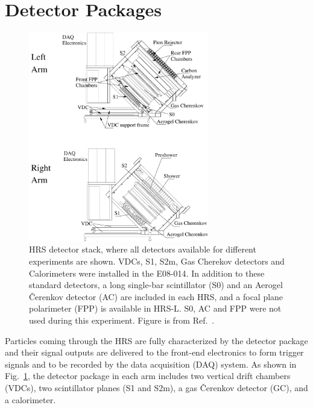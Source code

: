 \section{Detector Packages}
\begin{figure}[!ht]
 \begin{center}
  \includegraphics[width=0.7\textwidth]{./figures/halla_jlab/sideview_new}
  \caption[HRS detector stack]{\footnotesize{HRS detector stack, where all detectors available for different experiments are shown. VDCs, S1, S2m, Gas Cherekov detectors and Calorimeters were installed in the E08-014. In addition to these standard detectors, a long single-bar scintillator (S0) and an Aerogel \v{C}erenkov detector (AC) are included in each HRS, and a focal plane polarimeter (FPP) is available in HRS-L. S0, AC and FPP were not used during this experiment. Figure is from Ref.~\cite{halla_nim}.}}
  \label{detecor_hut}
 \end{center}
\end{figure}
 
 Particles coming through the HRS are fully characterized by the detector package and their signal outputs are delivered to the front-end electronics to form trigger signals and to be recorded by the data acquisition (DAQ) system. As shown in Fig.~\ref{detecor_hut}, the detector package in each arm includes two vertical drift chambers (VDCs), two scintillator planes (S1 and S2m), a gas \v{C}erenkov detector (GC), and a calorimeter. 
  
